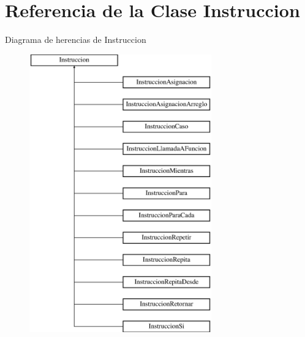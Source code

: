 \hypertarget{class_instruccion}{\section{Referencia de la Clase Instruccion}
\label{class_instruccion}
}
Diagrama de herencias de Instruccion\begin{figure}[H]
\begin{center}
\leavevmode
\includegraphics[height=12.000000cm]{class_instruccion}
\end{center}
\end{figure}

